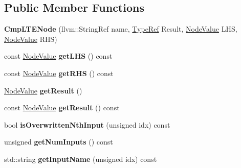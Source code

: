 \subsection*{Public Member Functions}
\begin{DoxyCompactItemize}
\item 
\mbox{\label{classglow_1_1_cmp_l_t_e_node_a2cb9646c261f8aa6848e5ae21d5d89d0}} 
{\bfseries Cmp\+L\+T\+E\+Node} (llvm\+::\+String\+Ref name, \hyperlink{structglow_1_1_type}{Type\+Ref} Result, \hyperlink{structglow_1_1_node_value}{Node\+Value} L\+HS, \hyperlink{structglow_1_1_node_value}{Node\+Value} R\+HS)
\item 
\mbox{\label{classglow_1_1_cmp_l_t_e_node_a49ffd36ffb8d19b8b978d5bf1364ff1e}} 
const \hyperlink{structglow_1_1_node_value}{Node\+Value} {\bfseries get\+L\+HS} () const
\item 
\mbox{\label{classglow_1_1_cmp_l_t_e_node_af1b1620ce8718b6025553eed53b8c403}} 
const \hyperlink{structglow_1_1_node_value}{Node\+Value} {\bfseries get\+R\+HS} () const
\item 
\mbox{\label{classglow_1_1_cmp_l_t_e_node_ac8aef4ab8046b7d0ca735b6c517e651f}} 
\hyperlink{structglow_1_1_node_value}{Node\+Value} {\bfseries get\+Result} ()
\item 
\mbox{\label{classglow_1_1_cmp_l_t_e_node_a9fca1498851e016c02abab02c52d365a}} 
const \hyperlink{structglow_1_1_node_value}{Node\+Value} {\bfseries get\+Result} () const
\item 
\mbox{\label{classglow_1_1_cmp_l_t_e_node_a8b629aaa6de1615c341ca6273ebb0aed}} 
bool {\bfseries is\+Overwritten\+Nth\+Input} (unsigned idx) const
\item 
\mbox{\label{classglow_1_1_cmp_l_t_e_node_a692825013ab5771418ddce643db51218}} 
unsigned {\bfseries get\+Num\+Inputs} () const
\item 
\mbox{\label{classglow_1_1_cmp_l_t_e_node_a5c55b5158451a6046f7ed103bb131082}} 
std\+::string {\bfseries get\+Input\+Name} (unsigned idx) const

\end{DoxyCompactItemize}
